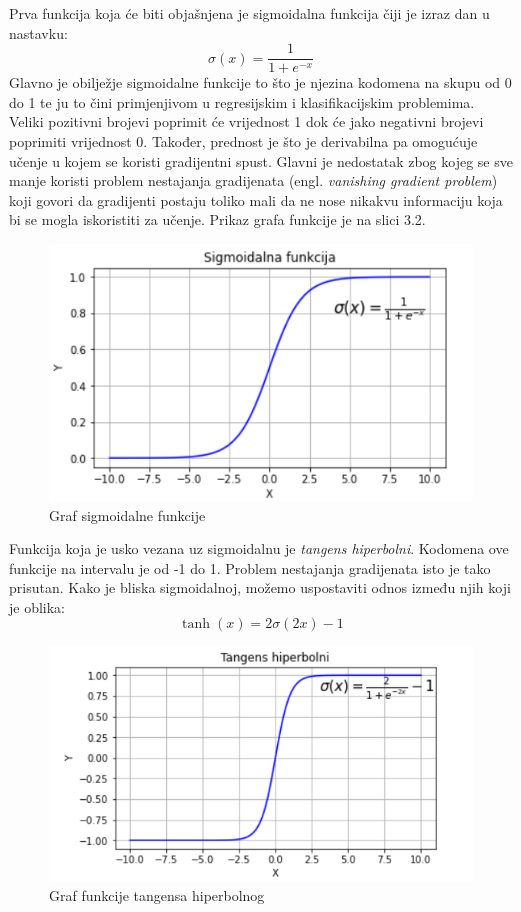 \documentclass[times, utf8, zavrsni, numeric]{fer}
\begin{document}
Prva funkcija koja će biti objašnjena je sigmoidalna funkcija čiji je izraz dan u nastavku:
\begin{equation}
\sigma(x)=\frac{1}{1 + e^{-x}}
\label{eq:Aktivacija}
\end{equation}
Glavno je obilježje sigmoidalne funkcije to što je njezina kodomena na skupu od 0 do 1 te ju to čini primjenjivom u regresijskim i klasifikacijskim problemima. Veliki pozitivni brojevi poprimit će vrijednost 1 dok će jako negativni brojevi poprimiti vrijednost 0. Također, prednost je što je derivabilna pa omogućuje učenje u kojem se koristi gradijentni spust. Glavni je nedostatak zbog kojeg se sve manje koristi problem nestajanja gradijenata (engl. \textit{vanishing gradient problem}) koji govori da gradijenti postaju toliko mali da ne nose nikakvu informaciju koja bi se mogla iskoristiti za učenje. Prikaz grafa funkcije je na slici 3.2.\\
\begin{figure}[htb]
\centering
\includegraphics[scale=0.6]{img/slika6.png}
\caption{Graf sigmoidalne funkcije}
\label{fig:Perceptron}
\end{figure}
\linebreak
Funkcija koja je usko vezana uz sigmoidalnu je \textit{tangens hiperbolni}. Kodomena ove funkcije na intervalu je od -1 do 1. Problem nestajanja gradijenata isto je tako prisutan. Kako je bliska sigmoidalnoj, možemo uspostaviti odnos između njih koji je oblika:
\begin{equation}
\tanh(x) = 2\sigma(2x)-1
\label{eq:Aktivacija}
\end{equation}
\begin{figure}[htb]
\centering
\includegraphics[scale=0.6]{img/slika7.png}
\caption{Graf funkcije tangensa hiperbolnog}
\label{fig:Perceptron}
\end{figure}\\
\end{document}
